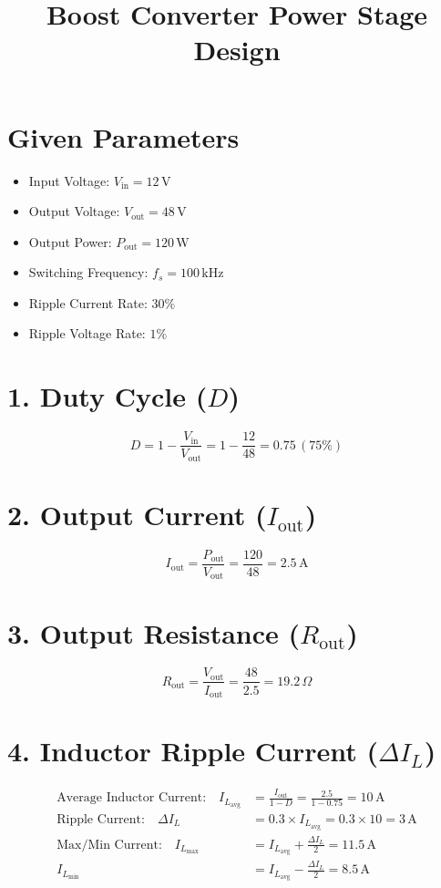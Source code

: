 \documentclass[12pt]{article}
\title{Boost Converter Power Stage Design}
\author{}
\date{}
\begin{document}
\maketitle

\section*{Given Parameters}
\begin{itemize}[label=$\bullet$]
    \item Input Voltage: \( V_{\text{in}} = 12 \, \text{V} \)
    \item Output Voltage: \( V_{\text{out}} = 48 \, \text{V} \)
    \item Output Power: \( P_{\text{out}} = 120 \, \text{W} \)
    \item Switching Frequency: \( f_s = 100 \, \text{kHz} \)
    \item Ripple Current Rate: \( 30\% \)
    \item Ripple Voltage Rate: \( 1\% \)
\end{itemize}

\section*{1. Duty Cycle (\( D \))}
\[
D = 1 - \frac{V_{\text{in}}}{V_{\text{out}}} = 1 - \frac{12}{48} = \boxed{0.75 \, (75\%)}
\]

\section*{2. Output Current (\( I_{\text{out}} \))}
\[
I_{\text{out}} = \frac{P_{\text{out}}}{V_{\text{out}}} = \frac{120}{48} = \boxed{2.5 \, \text{A}}
\]

\section*{3. Output Resistance (\( R_{\text{out}} \))}
\[
R_{\text{out}} = \frac{V_{\text{out}}}{I_{\text{out}}} = \frac{48}{2.5} = \boxed{19.2 \, \Omega}
\]

\section*{4. Inductor Ripple Current (\( \Delta I_L \))}
\begin{align*}
\text{Average Inductor Current:} \quad I_{L_{\text{avg}}} &= \frac{I_{\text{out}}}{1 - D} = \frac{2.5}{1 - 0.75} = 10 \, \text{A} \\
\text{Ripple Current:} \quad \Delta I_L &= 0.3 \times I_{L_{\text{avg}}} = 0.3 \times 10 = \boxed{3 \, \text{A}} \\
\text{Max/Min Current:} \quad I_{L_{\text{max}}} &= I_{L_{\text{avg}}} + \frac{\Delta I_L}{2} = \boxed{11.5 \, \text{A}} \\
I_{L_{\text{min}}} &= I_{L_{\text{avg}}} - \frac{\Delta I_L}{2} = \boxed{8.5 \, \text{A}}
\end{align*}
\end{document}
